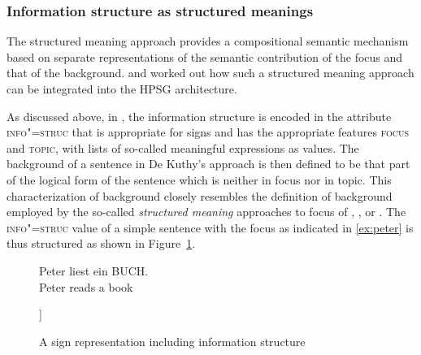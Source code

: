 \documentclass[output=paper]{langsci/langscibook}
\begin{document}
\subsubsection{Information structure as structured meanings \citep{deKuthy2002a}}
\label{sec:struc-meaning}
The structured meaning approach
\citep{Stechow81a-u,Jacobs83a,Krifka92a-u-kopiert} provides a
compositional semantic mechanism based on separate representations of
the semantic contribution of the focus and that of the
background. \citet{deKuthy2002a} and \cite{Webelhuth2007a-u} worked
out how such a structured meaning approach can be integrated into the HPSG
architecture.

As discussed above, in \cite{deKuthy2002a}, the information structure
is encoded in the attribute \textsc{info"=struc} that is appropriate
for signs and has the appropriate features \textsc{focus} and
\textsc{topic}, with lists of so-called meaningful expressions as
values. The background of a sentence in De Kuthy's approach is then defined
to be that part of the logical form of the sentence which is neither
in focus nor in topic.  This characterization of background closely
resembles the definition of background employed by the so-called
\textit{structured meaning} approaches to focus of
\cite{Stechow81a-u}, \cite{Jacobs83a}, or \cite{Krifka92a-u-kopiert}.
The \textsc{info"=struc} value of a simple sentence with the focus as
indicated in \ref{ex:peter} is thus structured as shown in
Figure~\ref{fig:focus-backgr}.
\begin{figure}[htb!]
\begin{exe}
  \ex\label{ex:peter} \gll Peter {\LF}liest ein BUCH.{\RF}\\
           Peter {}reads a book\\
\end{exe}
  \begin{center}
    \begin{avm}
      [s|loc|cont|lf  $\exists x \[book'\(x\) \wedge read'\(p,x\)\]$\\
       info-struc  [focus & \XlstI{$\lambda y \exists x\[book'\(x\) \wedge read'\(y,x\)\]$}\\
                     topic & \elst]
      ]
    \end{avm}
    \caption{A sign representation including information structure}
    \label{fig:focus-backgr}
  \end{center}\unskip
\end{figure}
\end{document}
